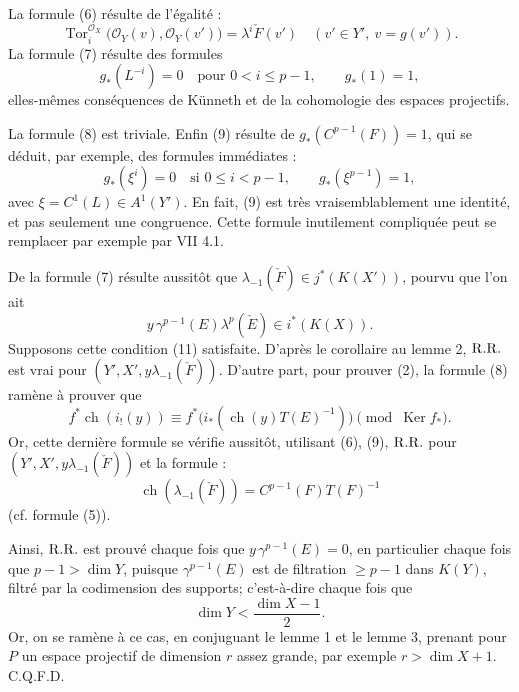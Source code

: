 \documentclass[11pt]{article}
\newcommand{\ch}{\operatorname{ch}}
\newcommand{\Tor}{\operatorname{Tor}}
\providecommand{\ch}{\operatorname{ch}}
\providecommand{\Tor}{\operatorname{Tor}}
\providecommand{\Ker}{\operatorname{Ker}}
\begin{document}
La formule (6) résulte de l'égalité :
\begin{equation}\tag{6 bis}
  \Tor_i^{\mathcal O_X}\bigl(\mathcal O_Y(v),\mathcal O_Y(v')\bigr)
  =
  \lambda^i\check F(v')
  \quad (v'\in Y',\ v=g(v')).
\end{equation}
La formule (7) résulte des formules
\begin{equation}\tag{10}
  g_*(L^{-i})=0\quad\text{pour }0<i\leq p-1,\qquad g_*(1)=1,
\end{equation}
elles-mêmes conséquences de Künneth et de la cohomologie des espaces projectifs.

La formule (8) est triviale. Enfin (9) résulte de \(g_*(C^{p-1}(F))=1\), qui se déduit, par exemple, des formules immédiates :
\begin{equation}\tag{10 bis}
  g_*(\xi^i)=0\quad\text{si }0\leq i<p-1,\qquad
  g_*(\xi^{p-1})=1,
\end{equation}
avec \(\xi=C^1(L)\in A^1(Y')\). En fait, (9) est très vraisemblablement une identité, et pas seulement une congruence. Cette formule inutilement compliquée peut se remplacer par exemple par VII 4.1.

De la formule (7) résulte aussitôt que \(\lambda_{-1}(\check F)\in j^*(K(X'))\), pourvu que l'on ait
\begin{equation}\tag{11}
  y\,\gamma^{p-1}(E)\lambda^p(\check E)\in i^*(K(X)).
\end{equation}
Supposons cette condition (11) satisfaite. D'après le corollaire au lemme 2, \(\mathrm{R.R.}\) est vrai pour \((Y',X',y\lambda_{-1}(\check F))\). D'autre part, pour prouver (2), la formule (8) ramène à prouver que
\begin{equation}\tag{12}
  f^*\ch(i_!(y))
  \equiv
  f^*\bigl(i_*(\ch(y)T(E)^{-1})\bigr)
  \pmod{\Ker f_*}.
\end{equation}
Or, cette dernière formule se vérifie aussitôt, utilisant (6), (9), \(\mathrm{R.R.}\) pour \((Y',X',y\lambda_{-1}(\check F))\) et la formule :
\begin{equation}\tag{13}
  \ch(\lambda_{-1}(\check F))=C^{p-1}(F)T(F)^{-1}
\end{equation}
(cf. formule (5)).

Ainsi, \(\mathrm{R.R.}\) est prouvé chaque fois que \(y\,\gamma^{p-1}(E)=0\), en particulier chaque fois que \(p-1>\dim Y\), puisque \(\gamma^{p-1}(E)\) est de filtration \(\geq p-1\) dans \(K(Y)\), filtré par la codimension des supports; c'est-à-dire chaque fois que
\[
  \dim Y < \frac{\dim X-1}{2}.
\]
Or, on se ramène à ce cas, en conjuguant le lemme 1 et le lemme 3, prenant pour \(P\) un espace projectif de dimension \(r\) assez grande, par exemple \(r>\dim X+1\). C.Q.F.D.
\end{document}
